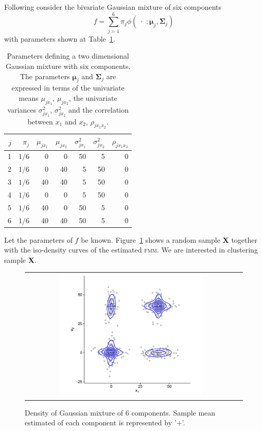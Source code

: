 \documentclass[submit]{smj}
\theoremstyle{definition}
\newcommand{\m}[1]{\boldsymbol{#1}}
\newcommand{\fmm}{\textsc{fmm}\xspace}
\begin{document}
Following \cite{baudry2010combining} consider the bivariate Gaussian mixture of six components
\[
f= \sum_{j=1}^6 \pi_j \phi(\;\cdot\; ;  \m\mu_j, \m\Sigma_j)
\]
with parameters shown at Table~\ref{pars_table}. 

\begin{table}[t]
\centering
\begin{tabular}{rrrrrrr}
  \hline
$j$ & $\pi_j$ & $\mu_{j x_1}$ & $\mu_{j x_2}$ & $\sigma^2_{j x_1}$ & $\sigma^2_{j x_2}$ & $\rho_{j x_1 x_2}$ \\ 
  \hline
  1 &  $1/6$ &     0 &     0 &    50 &     5 &     0 \\ 
  2 &  $1/6$  &     0 &    40 &     5 &    50 &     0 \\ 
  3 &  $1/6$  &    40 &    40 &     5 &    50 &     0 \\ 
  4 &  $1/6$  &     0 &     0 &     5 &    50 &     0 \\ 
  5 &  $1/6$  &    40 &     0 &    50 &     5 &     0 \\ 
  6 &  $1/6$  &    40 &    40 &    50 &     5 &     0 \\ 
   \hline
\end{tabular}
\caption{Parameters defining a two dimensional Gaussian mixture with six components. The parameters $\m\mu_j$ and $\m\Sigma_j$ are expressed in terms of the univariate means $\mu_{j x_1}$, $\mu_{j x_2}$, the univariate variances $\sigma^2_{j x_1}$, $\sigma^2_{j x_2}$ and the correlation between $x_1$ and $x_2$, $\rho_{j x_1 x_2}$.}
\label{pars_table}
\end{table}


Let the parameters of $f$ be known. Figure~\ref{ex_mixture} shows a random sample \textbf{X} together with the iso-density curves of the estimated \fmm. We are interested in clustering sample \textbf{X}.

\begin{figure}[htbp]
\begin{center}
\begin{tabular}{cc}
  \includegraphics[width=0.7\textwidth]{figures/partition-example-mixture.pdf} \\
 \end{tabular}
 \caption{Density of Gaussian mixture of 6 components. Sample mean estimated of each component is represented by '+'.}\label{ex_mixture}
\end{center}
\end{figure}
\end{document}
